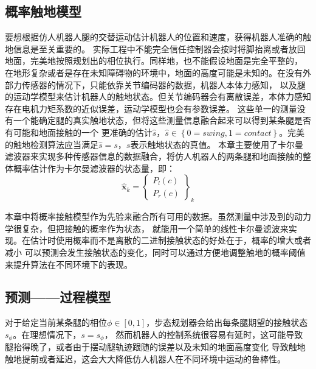 \subsection{概率触地模型}
\label{sec:prob_contact}
要想根据仿人机器人腿的交替运动估计机器人的位置和速度，获得机器人准确的触地信息是至关重要的。
实际工程中不能完全信任控制器会按时将脚抬离或者放回地面，完美地按照规划出的相位执行。同样地，也不能假设地面是完全平整的，
在地形复杂或者是存在未知障碍物的环境中，地面的高度可能是未知的。在没有外部力传感器的情况下，只能依靠关节编码器的数据，机器人本体力感知，
以及腿的运动学模型来估计机器人的触地状态。但关节编码器会有离散误差，本体力感知存在电机力矩系数的近似误差，运动学模型也会有参数误差。
这些单一的测量没有一个能确定腿的真实触地状态，但将这些测量信息融合起来可以得到某条腿是否有可能和地面接触的一个
更准确的估计$\hat s$，$\hat s \in \left\{0=swing, 1=contact\right\}$。完美的触地检测算法应当满足$\hat s = s$，$s$表示触地状态的真值。
本章主要使用了卡尔曼滤波器来实现多种传感器信息的数据融合，将仿人机器人的两条腿和地面接触的整体概率估计作为卡尔曼滤波器的状态量，即：
\begin{equation}
    \label{equ:est_state}
    \hat{\boldsymbol{x}}_k=\left\{\begin{array}{c}
        P_l(c) \\
        P_r(c)
        \end{array}\right\}_k
\end{equation}

本章中将概率接触模型作为先验来融合所有可用的数据。虽然测量中涉及到的动力学很复杂，但把接触的概率作为状态，
就能用一个简单的线性卡尔曼滤波来实现。在估计时使用概率而不是离散的二进制接触状态的好处在于，概率的增大或者减小
可以预测会发生接触状态的变化，同时可以通过方便地调整触地的概率阈值来提升算法在不同环境下的表现。
\subsection{预测——过程模型}
\label{sec:contact_pred}
对于给定当前某条腿的相位$\phi \in \left[0, 1\right]$，步态规划器会给出每条腿期望的接触状态$s_{\phi}$。在理想情况下，$s = s_{\phi}$，
然而机器人的控制系统很容易有延时，这可能导致腿抬得晚了，或者由于摆动腿轨迹跟随的误差以及未知的地面高度变化
导致触地触地提前或者延迟，这会大大降低仿人机器人在不同环境中运动的鲁棒性。


